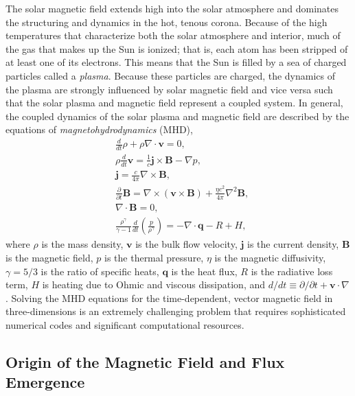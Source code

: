 The solar magnetic field extends high into the solar atmosphere and dominates the structuring and dynamics in the hot, tenous corona. Because of the high temperatures that characterize both the solar atmosphere and interior, much of the gas that makes up the Sun is ionized; that is, each atom has been stripped of at least one of its electrons. This means that the Sun is filled by a sea of charged particles called a \textit{plasma}. Because these particles are charged, the dynamics of the plasma are strongly influenced by solar magnetic field and vice versa such that the solar plasma and magnetic field represent a coupled system. In general, the coupled dynamics of the solar plasma and magnetic field are described by the equations of \textit{magnetohydrodynamics} (MHD),
\begin{align}
    &\frac{d}{dt}\rho + \rho\nabla\cdot\mathbf{v} = 0, \label{eq:mhd_continuity} \\
    &\rho\frac{d}{dt}\mathbf{v} = \frac{1}{c}\mathbf{j}\times\mathbf{B} - \nabla p, \label{eq:mhd_momentum} \\
    &\mathbf{j} = \frac{c}{4\pi}\nabla\times\mathbf{B}, \label{eq:mhd_ampere} \\
    &\frac{\partial}{\partial t}\mathbf{B} = \nabla\times(\mathbf{v}\times\mathbf{B}) + \frac{\eta c^2}{4\pi}\nabla^2\mathbf{B}, \label{eq:mhd_faraday} \\
    &\nabla\cdot\mathbf{B} = 0, \label{eq:mhd_divb} \\
    &\frac{\rho^\gamma}{\gamma - 1}\frac{d}{dt}\left(\frac{p}{\rho^{\gamma}}\right) = -\nabla\cdot\mathbf{q} - R + H, \label{eq:mhd_energy}
\end{align}
where $\rho$ is the mass density, $\mathbf{v}$ is the bulk flow velocity, $\mathbf{j}$ is the current density, $\mathbf{B}$ is the magnetic field, $p$ is the thermal pressure, $\eta$ is the magnetic diffusivity, $\gamma=5/3$ is the ratio of specific heats, $\mathbf{q}$ is the heat flux, $R$ is the radiative loss term, $H$ is heating due to Ohmic and viscous dissipation, and $d/dt\equiv\partial/\partial t + \mathbf{v}\cdot\nabla$ \citep{priest_magnetohydrodynamics_2014}. Solving the MHD equations for the time-dependent, vector magnetic field in three-dimensions is an extremely challenging problem that requires sophisticated numerical codes and significant computational resources.

\subsection{Origin of the Magnetic Field and Flux Emergence}\label{sec:magnetic-origins}

